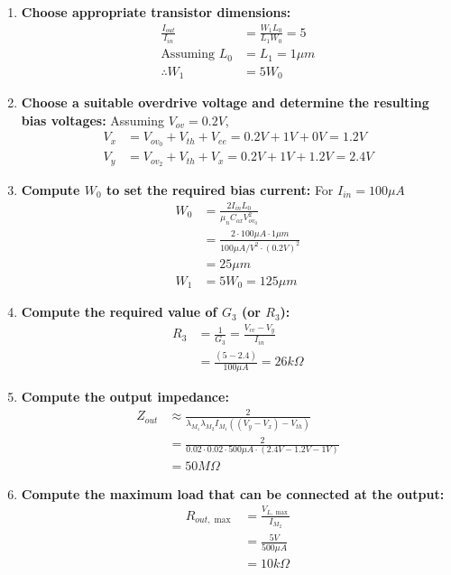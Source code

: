 \begin{enumerate}
  \item \textbf{Choose appropriate transistor dimensions:}
    \begin{align*}
      \frac{I_{out}}{I_{in}} &= \frac{W_1 L_0}{L_1 W_0} = 5 \\
      \text{Assuming } L_0 &= L_1 = 1 \mu m \\
      \therefore W_1 &= 5 W_0 \tag{i}
    \end{align*}
  \item \textbf{Choose a suitable overdrive voltage and determine
    the resulting bias voltages:} Assuming $V_{ov} = 0.2V$,
    \begin{align*}
      V_{x} &= V_{ov_0} + V_{th} + V_{ee} = 0.2V + 1V + 0V = 1.2V \\
      V_{y} &= V_{ov_2} + V_{th} + V_{x} = 0.2V + 1V + 1.2V = 2.4V
    \end{align*}
  \item \textbf{Compute $W_0$ to set the required bias current:}
    For $I_{in} = 100 \mu A$
    \begin{align*}
      W_0 &= \frac{2 I_{in} L_0}{\mu_n C_{ox} V_{ov_0}^2} \\
          &= \frac{2 \cdot 100 \mu A \cdot 1 \mu m}{100 \mu A/V^2 \cdot (0.2V)^2} \\
          &= 25 \mu m \\
      W_1 &= 5 W_0 = 125 \mu m
    \end{align*}
  \item \textbf{Compute the required value of $G_3$ (or $R_3$):}
    \begin{align*}
      R_3 &= \frac{1}{G_3} = \frac{V_{cc} - V_{y}}{I_{in}} \\
          &= \frac{(5 - 2.4)}{100 \mu A} = 26k \Omega
    \end{align*}
  \item \textbf{Compute the output impedance:}
    \begin{align*}
      Z_{out} &\approx \frac{2}{\lambda_{M_1} \lambda_{M_2} I_{M_1} ((V_{y} - V_{x}) - V_{th})} \\
              &= \frac{2}{0.02 \cdot 0.02 \cdot 500 \mu A \cdot (2.4V - 1.2V - 1V)} \\
              &= 50 M \Omega
    \end{align*}
  \item \textbf{Compute the maximum load that can be connected
    at the output:}
    \begin{align*}
      R_{out, \max} &= \frac{V_{L, \max}}{I_{M_2}} \\
                   &= \frac{5V}{500 \mu A} \\
                   &= 10 k\Omega
    \end{align*}
\end{enumerate}


